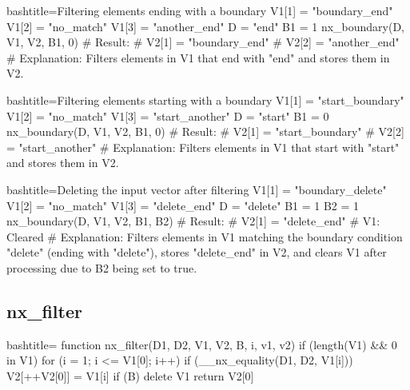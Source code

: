 \begin{NexCodeBox}{bash}{title={Filtering elements ending with a boundary}}
	V1[1] = "boundary_end"
	V1[2] = "no_match"
	V1[3] = "another_end"
	D = "end"
	B1 = 1
	nx_boundary(D, V1, V2, B1, 0)
	# Result:
	# V2[1] = "boundary_end"
	# V2[2] = "another_end"
	# Explanation: Filters elements in V1 that end with "end" and stores them in V2.
\end{NexCodeBox}

\begin{NexCodeBox}{bash}{title={Filtering elements starting with a boundary}}
	V1[1] = "start_boundary"
	V1[2] = "no_match"
	V1[3] = "start_another"
	D = "start"
	B1 = 0
	nx_boundary(D, V1, V2, B1, 0)
	# Result:
	# V2[1] = "start_boundary"
	# V2[2] = "start_another"
	# Explanation: Filters elements in V1 that start with "start" and stores them in V2.
\end{NexCodeBox}

\begin{NexCodeBox}{bash}{title={Deleting the input vector after filtering}}
	V1[1] = "boundary_delete"
	V1[2] = "no_match"
	V1[3] = "delete_end"
	D = "delete"
	B1 = 1
	B2 = 1
	nx_boundary(D, V1, V2, B1, B2)
	# Result:
	# V2[1] = "delete_end"
	# V1: Cleared
	# Explanation: Filters elements in V1 matching the boundary condition "delete" (ending with "delete"), stores "delete_end" in V2, and clears V1 after processing due to B2 being set to true.
\end{NexCodeBox}

\newpage
\subsection{nx_filter}
\label{nx_filter}
\begin{NexCodeBox}{bash}{title={}}
function nx_filter(D1, D2, V1, V2, B,   i, v1, v2)
{
	if (length(V1) && 0 in V1) {
		for (i = 1; i <= V1[0]; i++) {
			if (__nx_equality(D1, D2, V1[i]))
				V2[++V2[0]] = V1[i]
		}
		if (B)
			delete V1
		return V2[0]
	}
}
\end{NexCodeBox}

